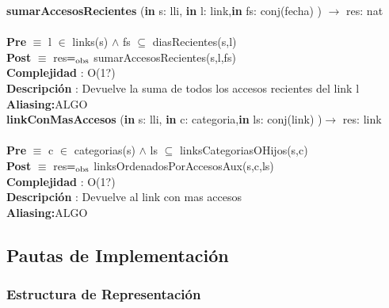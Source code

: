 \documentclass[10pt, a4paper]{article}
\begin{document}
	\textbf{sumarAccesosRecientes} (\textbf{in} s: lli, \textbf{in} l: link,\textbf{in} fs: conj(fecha) ) $\longrightarrow$ res: nat\\\\
	\textbf{Pre} $\equiv$ {l $\in$ links(s)  $\wedge$ fs $\subseteq$ diasRecientes(s,l)}\\
	\textbf{Post} $\equiv$ {res$=_{\mathrm{obs}}$ sumarAccesosRecientes(s,l,fs)}\\
	\textbf{Complejidad} : O(1?)\\
	\textbf{Descripci\'{o}n} : Devuelve la suma de todos los accesos recientes del link l\\
	\textbf{Aliasing:}ALGO \\

	\textbf{linkConMasAccesos} (\textbf{in} s: lli, \textbf{in} c: categoria,\textbf{in} ls: conj(link) )$\longrightarrow$ res: link\\\\
	\textbf{Pre} $\equiv$ {c $\in$ categorias(s)  $\wedge$ ls $\subseteq$ linksCategoriasOHijos(s,c)}\\
	\textbf{Post} $\equiv$ {res$=_{\mathrm{obs}}$ linksOrdenadosPorAccesosAux(s,c,ls)}\\
	\textbf{Complejidad} : O(1?)\\
	\textbf{Descripci\'{o}n} : Devuelve al link con mas accesos\\
	\textbf{Aliasing:}ALGO \\
	
    \subsection{\huge Pautas de Implementaci\'{o}n}	

        \subsubsection{\Large Estructura de Representaci\'{o}n} 
\end{document}
